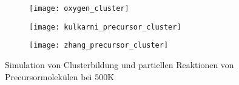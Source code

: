 \begin{figure}[p]

  \captionsetup[subfigure]{singlelinecheck=false}
  \begin{subfigure}[t]{4cm}
    \texttt{[image: oxygen\_cluster]}
  \end{subfigure}
  \hfill
  \begin{subfigure}[t]{5.5cm}
    \texttt{[image: kulkarni\_precursor\_cluster]}
  \end{subfigure}
  \hfill
  \begin{subfigure}[t]{4.5cm}
    \texttt{[image: zhang\_precursor\_cluster]}
  \end{subfigure}

  \caption{Simulation von Clusterbildung und partiellen Reaktionen von Precursormolekülen bei 500K}
  \label{fig:precursorclusters}

\end{figure}
